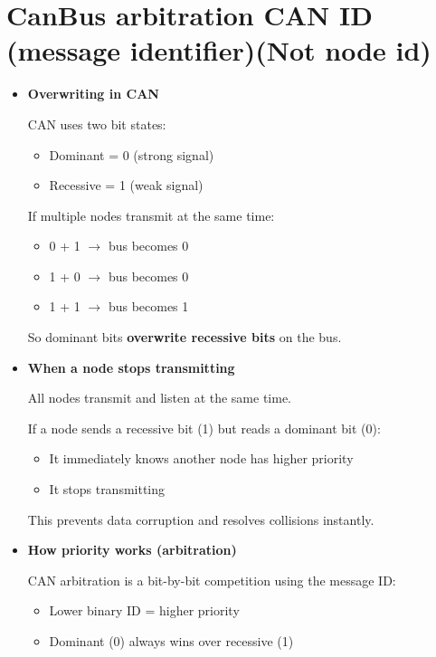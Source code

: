 \clearpage
\section{CanBus arbitration CAN ID (message identifier)(Not node id)}

\begin{itemize}

\item \textbf{Overwriting in CAN}

CAN uses two bit states:
\begin{itemize}
    \item Dominant = 0 (strong signal)
    \item Recessive = 1 (weak signal)
\end{itemize}

If multiple nodes transmit at the same time:
\begin{itemize}
    \item 0 + 1 $\rightarrow$ bus becomes 0
    \item 1 + 0 $\rightarrow$ bus becomes 0
    \item 1 + 1 $\rightarrow$ bus becomes 1
\end{itemize}

So dominant bits \textbf{overwrite recessive bits} on the bus.

\item \textbf{When a node stops transmitting}

All nodes transmit and listen at the same time.

If a node sends a recessive bit (1) but reads a dominant bit (0):
\begin{itemize}
    \item It immediately knows another node has higher priority
    \item It stops transmitting
\end{itemize}

This prevents data corruption and resolves collisions instantly.

\item \textbf{How priority works (arbitration)}

CAN arbitration is a bit-by-bit competition using the message ID:

\begin{itemize}
    \item Lower binary ID = higher priority
    \item Dominant (0) always wins over recessive (1)
\end{itemize}


\end{itemize}

